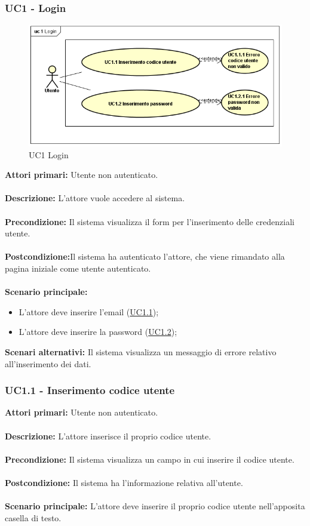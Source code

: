 \subsubsection{UC1 - Login}
    \label{UC1}
    \begin{figure}[!h] 
        \centering 
        \includegraphics[width = 13cm]{immagini/UseCase/login.png} 
        \caption{UC1 Login}
    \end{figure}
    \textbf{Attori primari:} Utente non autenticato.
    \\
    \\
    \textbf{Descrizione:} L'attore vuole accedere al sistema.
    \\
    \\
    \textbf{Precondizione:} Il sistema visualizza il form per l'inserimento delle credenziali utente.
    \\
    \\
    \textbf{Postcondizione:}Il sistema ha autenticato l'attore, che viene rimandato alla pagina iniziale come utente autenticato.
    \\
    \\
    \textbf{Scenario principale:}
        \begin{itemize}
            \item L'attore deve inserire l'email (\hyperref[UC1.1]{UC1.1});
            \item L'attore deve inserire la password (\hyperref[UC1.2]{UC1.2});
        \end{itemize}
    \textbf{Scenari alternativi:} Il sistema visualizza un messaggio di errore relativo all'inserimento dei dati.


\subsubsection{UC1.1 - Inserimento codice utente}
    \label{UC1.1}
    \textbf{Attori primari:} Utente non autenticato.
    \\
    \\
    \textbf{Descrizione:} L'attore inserisce il proprio codice utente.
    \\
    \\
    \textbf{Precondizione:} Il sistema visualizza un campo in cui inserire il codice utente.
    \\
    \\
    \textbf{Postcondizione:} Il sistema ha l'informazione relativa all'utente.
    \\
    \\
    \textbf{Scenario principale:} L'attore deve inserire il proprio codice utente nell'apposita casella di testo.


